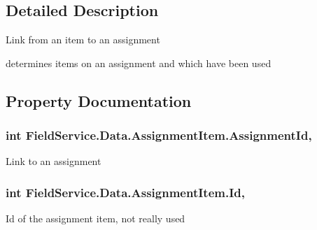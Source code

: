\subsection{Detailed Description}
Link from an item to an assignment 


\begin{DoxyItemize}
\item determines items on an assignment and which have been used 
\end{DoxyItemize}

\subsection{Property Documentation}
\hypertarget{class_field_service_1_1_data_1_1_assignment_item_a6d2af96695502f19da2fa12058c4b66d}{
\subsubsection[{Assignment\+Id}]{\setlength{\rightskip}{0pt plus 5cm}int Field\+Service.\+Data.\+Assignment\+Item.\+Assignment\+Id\hspace{0.3cm}{\ttfamily [get]}, {\ttfamily [set]}}}\label{class_field_service_1_1_data_1_1_assignment_item_a6d2af96695502f19da2fa12058c4b66d}


Link to an assignment 

\hypertarget{class_field_service_1_1_data_1_1_assignment_item_ac531826ff2b7d9c84ee5743de5554c25}{
\subsubsection[{Id}]{\setlength{\rightskip}{0pt plus 5cm}int Field\+Service.\+Data.\+Assignment\+Item.\+Id\hspace{0.3cm}{\ttfamily [get]}, {\ttfamily [set]}}}\label{class_field_service_1_1_data_1_1_assignment_item_ac531826ff2b7d9c84ee5743de5554c25}


Id of the assignment item, not really used 

